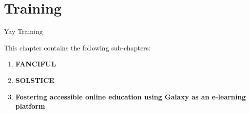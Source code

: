 \cleartorightpage

\chapter{Training}\label{chapter:training}

\setcounter{figure}{-1}
\setcounter{table}{-1}
\setcounter{section}{-1}

Yay Training

This chapter contains the following sub-chapters:

\begin{enumerate}[label=\ref{chapter:training}.\arabic*]
\itemsep-0.5em
\setcounter{enumi}{-1}
\item \textbf{FANCIFUL}
\item \textbf{SOLSTICE}
\item \textbf{Fostering accessible online education using Galaxy as an e-learning platform}
\end{enumerate}

